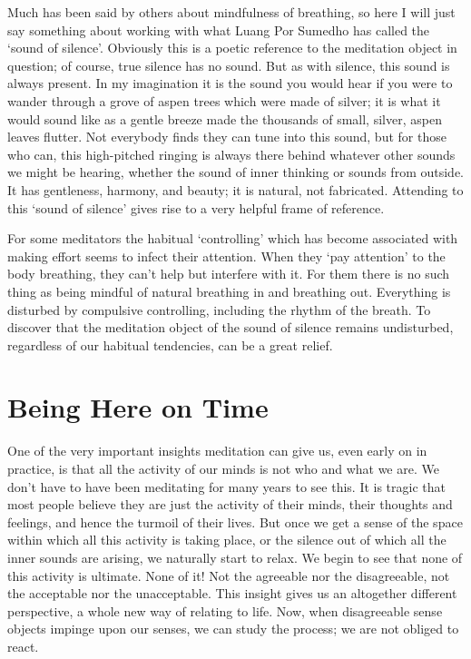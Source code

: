Much has been said by others about mindfulness of breathing, so here I
will just say something about working with what Luang Por Sumedho has
called the ‘sound of silence’. Obviously this is a poetic reference to
the meditation object in question; of course, true silence has no sound.
But as with silence, this sound is always present. In my imagination it
is the sound you would hear if you were to wander through a grove of
aspen trees which were made of silver; it is what it would sound like as
a gentle breeze made the thousands of small, silver, aspen leaves
flutter. Not everybody finds they can tune into this sound, but for
those who can, this high-pitched ringing is always there behind whatever
other sounds we might be hearing, whether the sound of inner thinking or
sounds from outside. It has gentleness, harmony, and beauty; it is
natural, not fabricated. Attending to this ‘sound of silence’ gives rise
to a very helpful frame of reference.

For some meditators the habitual ‘controlling’ which has become
associated with making effort seems to infect their attention. When they
‘pay attention’ to the body breathing, they can’t help but interfere
with it. For them there is no such thing as being mindful of natural
breathing in and breathing out. Everything is disturbed by compulsive
controlling, including the rhythm of the breath. To discover that the
meditation object of the sound of silence remains undisturbed,
regardless of our habitual tendencies, can be a great relief.

\section{Being Here on Time}

One of the very important insights meditation can give us, even early on
in practice, is that all the activity of our minds is not who and what
we are. We don’t have to have been meditating for many years to see
this. It is tragic that most people believe they are just the activity
of their minds, their thoughts and feelings, and hence the turmoil of
their lives. But once we get a sense of the space within which all this
activity is taking place, or the silence out of which all the inner
sounds are arising, we naturally start to relax. We begin to see that
none of this activity is ultimate. None of it! Not the agreeable nor the
disagreeable, not the acceptable nor the unacceptable. This insight
gives us an altogether different perspective, a whole new way of
relating to life. Now, when disagreeable sense objects impinge upon our
senses, we can study the process; we are not obliged to react.

